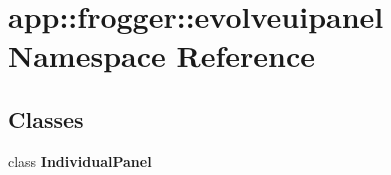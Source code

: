 \section{app::frogger::evolveuipanel Namespace Reference}
\label{namespaceapp_1_1frogger_1_1evolveuipanel}


\subsection*{Classes}
\begin{CompactItemize}
\item 
class {\bf IndividualPanel}
\end{CompactItemize}

